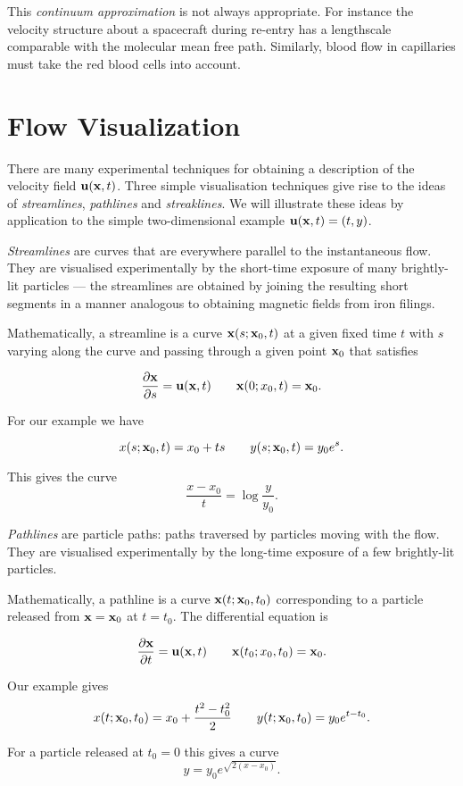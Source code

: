 \documentclass{notes}
\begin{document}
This \emph{continuum approximation} is not always appropriate.  For
instance the velocity structure about a spacecraft during re-entry has
a lengthscale comparable with the molecular mean free path.
Similarly, blood flow in capillaries must take the red blood cells
into account.

\section{Flow Visualization}

There are many experimental techniques for obtaining a description of
the velocity field $\mathbf{u}(\mathbf{x},t)$.  Three simple visualisation techniques
give rise to the ideas of \emph{streamlines}, \emph{pathlines} and
\emph{streaklines}.  We will illustrate these ideas by application to
the simple two-dimensional example $\mathbf{u}(\mathbf{x},t) = (t,y)$.

\emph{Streamlines} are curves that are everywhere parallel to the
instantaneous flow.  They are visualised experimentally by the
short-time exposure of many brightly-lit particles --- the streamlines
are obtained by joining the resulting short segments in a manner
analogous to obtaining magnetic fields from iron filings.

Mathematically, a streamline is a curve $\mathbf{x}(s;\mathbf{x}_0,t)$ at a given
fixed time $t$ with $s$ varying along the curve and passing through a
given point $\mathbf{x}_0$ that satisfies

\[
\frac{\partial \mathbf{x}}{\partial s} = \mathbf{u}(\mathbf{x},t) \qquad \mathbf{x}(0;x_0,t) = \mathbf{x}_0.
\]

For our example we have

\[
x(s;\mathbf{x}_0,t) = x_0 + t s \qquad y(s;\mathbf{x}_0,t) = y_0 e^s.
\]

This gives the curve
\[
\frac{x - x_0}{t} = \log \frac{y}{y_0}.
\]

\emph{Pathlines} are particle paths: paths traversed by particles
moving with the flow.  They are visualised experimentally by the
long-time exposure of a few brightly-lit particles.

Mathematically, a pathline is a curve $\mathbf{x}(t;\mathbf{x}_0,t_0)$ corresponding
to a particle released from $\mathbf{x} = \mathbf{x}_0$ at $t = t_0$.  The
differential equation is

\[
\frac{\partial \mathbf{x}}{\partial t} = \mathbf{u}(\mathbf{x},t) \qquad \mathbf{x}(t_0;x_0,t_0) = \mathbf{x}_0.
\]

Our example gives
\[
x(t;\mathbf{x}_0,t_0) = x_0 + \frac{t^2-t_0^2}{2} \qquad y(t;\mathbf{x}_0,t_0) = y_0
e^{t - t_0}.
\]

For a particle released at $t_0 = 0$ this gives a curve
\[
y = y_0 e^{\sqrt{2(x-x_0)}}.
\]
\end{document}
